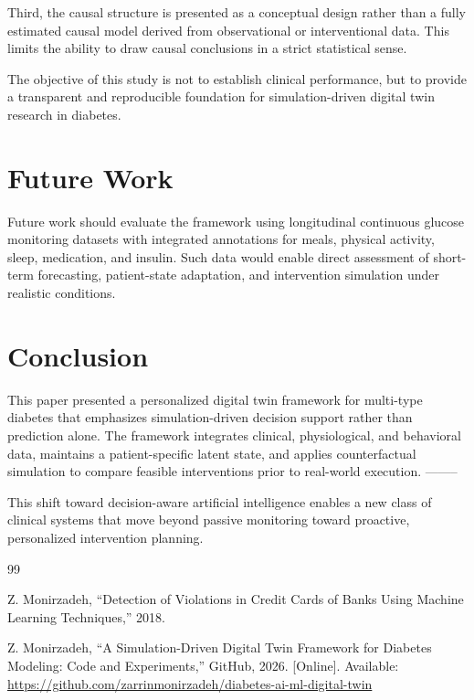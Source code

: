 \documentclass[journal]{IEEEtran}
\begin{document}
Third, the causal structure is presented as a conceptual design rather than a fully estimated causal model derived from observational or interventional data. This limits the ability to draw causal conclusions in a strict statistical sense.

The objective of this study is not to establish clinical performance, but to provide a transparent and reproducible foundation for simulation-driven digital twin research in diabetes.

\section{Future Work}
Future work should evaluate the framework using longitudinal continuous glucose monitoring datasets with integrated annotations for meals, physical activity, sleep, medication, and insulin. Such data would enable direct assessment of short-term forecasting, patient-state adaptation, and intervention simulation under realistic conditions.


\section{Conclusion}
This paper presented a personalized digital twin framework for multi-type diabetes that emphasizes simulation-driven decision support rather than prediction alone. The framework integrates clinical, physiological, and behavioral data, maintains a patient-specific latent state, and applies counterfactual simulation to compare feasible interventions prior to real-world execution.
--------

This shift toward decision-aware artificial intelligence enables a new class of clinical systems that move beyond passive monitoring toward proactive, personalized intervention planning.

\begin{thebibliography}{99}

Z. Monirzadeh, “Detection of Violations in Credit Cards of Banks Using Machine Learning Techniques,” 2018.

Z. Monirzadeh, “A Simulation-Driven Digital Twin Framework for Diabetes Modeling: Code and Experiments,”
GitHub, 2026. [Online]. Available:
\url{https://github.com/zarrinmonirzadeh/diabetes-ai-ml-digital-twin}

\end{thebibliography}

\vspace{2em}
\end{document}
